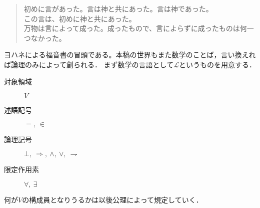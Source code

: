 	\begin{quote}
		初めに言があった。言は神と共にあった。言は神であった。\\
		この言は、初めに神と共にあった。\\
		万物は言によって成った。成ったもので、言によらずに成ったものは何一つなかった。
	\end{quote}
	ヨハネによる福音書の冒頭である。本稿の世界もまた数学のことば，言い換えれば論理のみによって創られる．
	まず数学の言語として$\mathcal{L}$というものを用意する．
	\begin{comment}
	言と書いてことばと読む．なぜ``言葉''ではなく``言''と書くのだろうか．
	一説によれば言葉の葉の字の由来は万葉古今集仮名序にあり，
	現代的に説明すれば，見聞きしたり感動したりしたところを種にして生じる語彙のことを木の葉に喩えているらしい．
	言葉は人が発するものであり，たいていの場合食い違いなく通用する．ならばすなわち，
	葉が付かない``言''とは，人為の介入する前から世界を認識し，人が自覚する前から人の心に通底している
	コードと解釈すれば良いのであろうか．一気に言の字が神格を帯びてくるが，
	``言葉''ではなく``言''と書くことの謎解きとしてはあながち見当はずれでもないらしく，
	上の引用文の通り%
	キリスト教においてことばとは神であり森羅万象を超越しているのである．
	しかもキリスト教に限らずとも，信仰心が薄いと言われる日本でさえ``はじめにことばありき''の文句が闊歩している程，
	それはこの世の真理として2000年以上も国籍や文化を問わず多くの人に受け入れられてきた．
	
		実際に自然言語の発生が事物の観測なしに起こり得たかという問題は言語哲学上も決着がついていないらしいが，
		少なくとも
	
	そして本稿の世界もまた数学のことば，言い換えれば論理のみによって創られるという点でキリスト教的であり，それ以上に
	ことばから始めようというのは，人が生来持っている直観に対して自然な起りなのであろう．
	しかしながら，神なることばが世界の悉くを尽くせる一方で，人が創造する数学の世界は論理のみによっては完結し得ないという事実もある．
	\end{comment}
	
	
	\begin{description}
		\item[対象領域] $V$
		\item[述語記号] $=,\ \in$
		\item[論理記号] $\bot,\ \Longrightarrow,\ \wedge,\ \vee,\ \rightharpoondown$
		\item[限定作用素] $\forall,\ \exists$
	\end{description}
	何が$V$の構成員となりうるかは以後公理によって規定していく．
	
